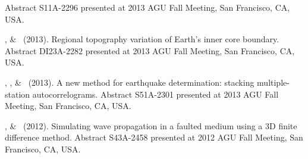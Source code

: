 \begin{etaremune}
    Abstract S11A-2296 presented at 2013 AGU Fall Meeting, San Francisco, CA, USA.
\item
    \Me, \& \LWen\ (2013).
    Regional topography variation of Earth's inner core boundary.
    Abstract DI23A-2282 presented at 2013 AGU Fall Meeting, San Francisco, CA, USA.
\item
    \MZhang, \Me, \& \LWen\ (2013).
    A new method for earthquake determination: stacking multiple-station autocorrelograms.
    Abstract S51A-2301 presented at 2013 AGU Fall Meeting, San Francisco, CA, USA.
\item
    \Me, \& \LWen\ (2012).
    Simulating wave propagation in a faulted medium using a 3D finite difference method.
    Abstract S43A-2458 presented at 2012 AGU Fall Meeting, San Francisco, CA, USA.
\end{etaremune}
